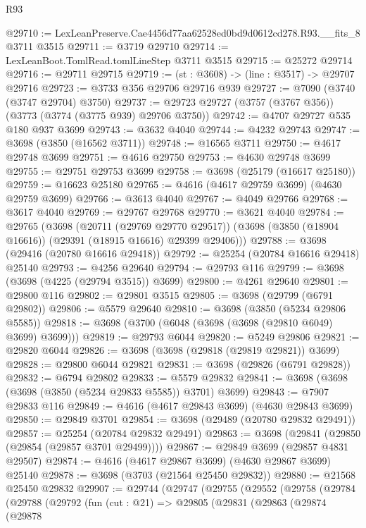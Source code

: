 \begin{lexlean}{R93}
\begin{coremodule}
@29710 := LexLeanPreserve.Cae4456d77aa62528ed0bd9d0612cd278.R93.__fits_8 @3711 @3515
@29711 := @3719 @29710
@29714 := LexLeanBoot.TomlRead.tomlLineStep @3711 @3515
@29715 := @25272 @29714
@29716 := @29711 @29715
@29719 := (st : @3608) -> (line : @3517) -> @29707 @29716
@29723 := @3733 @356 @29706 @29716 @939
@29727 := @7090 (@3740 (@3747 @29704) @3750)
@29737 := @29723 @29727 (@3757 (@3767 @356)) (@3773 (@3774 (@3775 @939) @29706 @3750))
@29742 := @4707 @29727 @535 @180 @937 @3699
@29743 := @3632 @4040
@29744 := @4232 @29743
@29747 := @3698 (@3850 (@16562 @3711))
@29748 := @16565 @3711
@29750 := @4617 @29748 @3699
@29751 := @4616 @29750
@29753 := @4630 @29748 @3699
@29755 := @29751 @29753 @3699
@29758 := @3698 (@25179 (@16617 @25180))
@29759 := @16623 @25180
@29765 := @4616 (@4617 @29759 @3699) (@4630 @29759 @3699)
@29766 := @3613 @4040
@29767 := @4049 @29766
@29768 := @3617 @4040
@29769 := @29767 @29768
@29770 := @3621 @4040
@29784 := @29765
    (@3698
      (@20711 (@29769 @29770 @29517))
      (@3698 (@3850 (@18904 @16616)) (@29391 (@18915 @16616) @29399 @29406)))
@29788 := @3698 (@29416 (@20780 @16616 @29418))
@29792 := @25254 (@20784 @16616 @29418) @25140
@29793 := @4256 @29640
@29794 := @29793 @116
@29799 := @3698 (@3698 (@4225 (@29794 @3515)) @3699)
@29800 := @4261 @29640
@29801 := @29800 @116
@29802 := @29801 @3515
@29805 := @3698 (@29799 (@6791 @29802))
@29806 := @5579 @29640
@29810 := @3698 (@3850 (@5234 @29806 @5585))
@29818 := @3698 (@3700 (@6048 (@3698 (@3698 (@29810 @6049) @3699) @3699)))
@29819 := @29793 @6044
@29820 := @5249 @29806
@29821 := @29820 @6044
@29826 := @3698 (@3698 (@29818 (@29819 @29821)) @3699)
@29828 := @29800 @6044 @29821
@29831 := @3698 (@29826 (@6791 @29828))
@29832 := @6794 @29802
@29833 := @5579 @29832
@29841 := @3698 (@3698 (@3698 (@3850 (@5234 @29833 @5585)) @3701) @3699)
@29843 := @7907 @29833 @116
@29849 := @4616 (@4617 @29843 @3699) (@4630 @29843 @3699)
@29850 := @29849 @3701
@29854 := @3698 (@29489 (@20780 @29832 @29491))
@29857 := @25254 (@20784 @29832 @29491)
@29863 := @3698 (@29841 (@29850 (@29854 (@29857 @3701 @29499))))
@29867 := @29849 @3699 (@29857 @4831 @29507)
@29874 := @4616 (@4617 @29867 @3699) (@4630 @29867 @3699) @25140
@29878 := @3698 (@3703 (@21564 @25450 @29832))
@29880 := @21568 @25450 @29832
@29907 := @29744
    (@29747
      (@29755
        (@29552
          (@29758
            (@29784
              (@29788
                (@29792
                  (fun (cut : @21) =>
                  @29805
                    (@29831
                      (@29863
                        (@29874
                          (@29878

\end{coremodule}
\end{lexlean}
